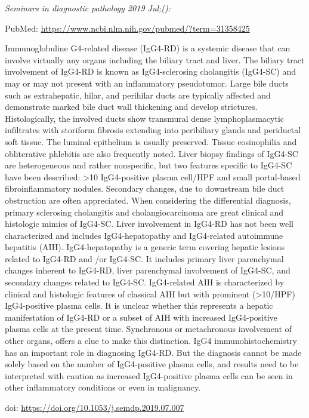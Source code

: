 \documentclass[]{article}
\begin{document}
\emph{Seminars in diagnostic pathology 2019 Jul;():}

PubMed: \url{https://www.ncbi.nlm.nih.gov/pubmed/?term=31358425}

Immunoglobuline G4-related disease (IgG4-RD) is a systemic disease that
can involve virtually any organs including the biliary tract and liver.
The biliary tract involvement of IgG4-RD is known as IgG4-sclerosing
cholangitis (IgG4-SC) and may or may not present with an inflammatory
pseudotumor. Large bile ducts such as extrahepatic, hilar, and perihilar
ducts are typically affected and demonstrate marked bile duct wall
thickening and develop strictures. Histologically, the involved ducts
show transmural dense lymphoplasmacytic infiltrates with storiform
fibrosis extending into peribiliary glands and periductal soft tissue.
The luminal epithelium is usually preserved. Tissue eosinophilia and
obliterative phlebitis are also frequently noted. Liver biopsy findings
of IgG4-SC are heterogeneous and rather nonspecific, but two features
specific to IgG4-SC have been described: \textgreater{}10 IgG4-positive
plasma cell/HPF and small portal-based fibroinflammatory nodules.
Secondary changes, due to downstream bile duct obstruction are often
appreciated. When considering the differential diagnosis, primary
sclerosing cholangitis and cholangiocarcinoma are great clinical and
histologic mimics of IgG4-SC. Liver involvement in IgG4-RD has not been
well characterized and includes IgG4-hepatopathy and IgG4-related
autoimmune hepatitis (AIH). IgG4-hepatopathy is a generic term covering
hepatic lesions related to IgG4-RD and /or IgG4-SC. It includes primary
liver parenchymal changes inherent to IgG4-RD, liver parenchymal
involvement of IgG4-SC, and secondary changes related to IgG4-SC.
IgG4-related AIH is characterized by clinical and histologic features of
classical AIH but with prominent (\textgreater{}10/HPF) IgG4-positive
plasma cells. It is unclear whether this represents a hepatic
manifestation of IgG4-RD or a subset of AIH with increased IgG4-positive
plasma cells at the present time. Synchronous or metachronous
involvement of other organs, offers a clue to make this distinction.
IgG4 immunohistochemistry has an important role in diagnosing IgG4-RD.
But the diagnosis cannot be made solely based on the number of
IgG4-positive plasma cells, and results need to be interpreted with
caution as increased IgG4-positive plasma cells can be seen in other
inflammatory conditions or even in malignancy.

doi: \url{https://doi.org/10.1053/j.semdp.2019.07.007}
\end{document}
